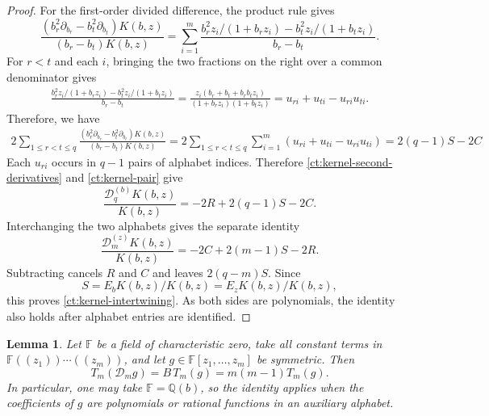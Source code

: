 \documentclass[reqno, 12pt]{article}
\numberwithin{equation}{section}
\newtheorem{lemma}[theorem]{Lemma}
\theoremstyle{definition}
\begin{document}
\begin{proof}
For the first-order divided difference, the product rule gives
\[
 \frac{(b_r^2\partial_{b_r}-b_t^2\partial_{b_t})K(b,z)}
      {(b_r-b_t)K(b,z)}
 =\sum_{i=1}^m
   \frac{b_r^2z_i/(1+b_rz_i)-b_t^2z_i/(1+b_tz_i)}
        {b_r-b_t}.
\]
For $r<t$ and each $i$, bringing the two fractions on the right
over a common denominator gives
\begin{align}
\frac{b_r^2z_i/(1+b_rz_i)-b_t^2z_i/(1+b_tz_i)}{b_r-b_t}=\frac{z_i(b_r+b_t+b_rb_tz_i)}{(1+b_rz_i)(1+b_tz_i)}
=u_{ri}+u_{ti}-u_{ri}u_{ti}.
\label{ct:kernel-pair}
\end{align}
Therefore, we have
\begin{align*}
2\sum_{1\leq r<t\leq q}\frac{(b_r^2\partial_{b_r}-b_t^2\partial_{b_t})K(b,z)}{(b_r-b_t)K(b,z)}
=2\sum_{1\leq r<t\leq q}\sum_{i=1}^m(u_{ri}+u_{ti}-u_{ri}u_{ti})=2(q-1)S-2C
\end{align*}
Each $u_{ri}$ occurs in $q-1$ pairs of alphabet indices.  Therefore
\eqref{ct:kernel-second-derivatives} and \eqref{ct:kernel-pair} give
\begin{equation}\label{ct:kernel-b-action}
 \frac{\mathcal D_q^{(b)}K(b,z)}{K(b,z)}
 =-2R+2(q-1)S-2C.
\end{equation}
Interchanging the two alphabets gives the separate identity
\begin{equation}\label{ct:kernel-z-action}
 \frac{\mathcal D_m^{(z)}K(b,z)}{K(b,z)}
 =-2C+2(m-1)S-2R.
\end{equation}
Subtracting cancels $R$ and $C$ and leaves $2(q-m)S$.
Since 
$$S=E_bK(b,z)/K(b,z)=E_zK(b,z)/K(b,z),$$ this proves
\eqref{ct:kernel-intertwining}.  As both sides are polynomials,
the identity also holds after alphabet entries are identified.
\end{proof}

\begin{lemma}\label{ct:adjoint}
Let $\mathbb F$ be a field of characteristic zero, take all
constant terms in $\mathbb F((z_1))\cdots((z_m))$, and let
$g\in\mathbb F[z_1,\ldots,z_m]$ be symmetric.  Then
\begin{equation}\label{ct:adjoint-identity}
 T_m(\mathcal D_mg)=B\,T_m(g)=m(m-1)T_m(g).
\end{equation}
In particular, one may take $\mathbb F=\mathbb Q(b)$, so the
identity applies when the coefficients of $g$ are polynomials
or rational functions in an auxiliary alphabet.
\end{lemma}
\end{document}
